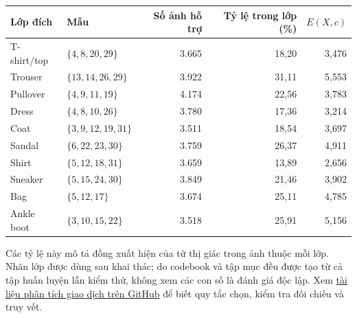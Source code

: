 \begin{center}
    \label{tab:fashion_top_pattern_per_class}
    \scriptsize
    \setlength{\tabcolsep}{2pt}
    \begin{tabular}{@{}l l r r r@{}}
        \toprule
        Lớp đích & Mẫu & Số ảnh hỗ trợ & Tỷ lệ trong lớp (\%) & $E(X,c)$ \\
        \midrule
        T-shirt/top & $\{4,8,20,29\}$ & 3.665 & 18,20 & 3,476 \\
        Trouser & $\{13,14,26,29\}$ & 3.922 & 31,11 & 5,553 \\
        Pullover & $\{4,9,11,19\}$ & 4.174 & 22,56 & 3,783 \\
        Dress & $\{4,8,10,26\}$ & 3.780 & 17,36 & 3,214 \\
        Coat & $\{3,9,12,19,31\}$ & 3.511 & 18,54 & 3,697 \\
        Sandal & $\{6,22,23,30\}$ & 3.759 & 26,37 & 4,911 \\
        Shirt & $\{5,12,18,31\}$ & 3.659 & 13,89 & 2,656 \\
        Sneaker & $\{5,15,24,30\}$ & 3.849 & 21,46 & 3,902 \\
        Bag & $\{5,12,17\}$ & 3.674 & 25,11 & 4,785 \\
        Ankle boot & $\{3,10,15,22\}$ & 3.518 & 25,91 & 5,156 \\
        \bottomrule
    \end{tabular}
\end{center}

Các tỷ lệ này mô tả đồng xuất hiện của từ thị giác trong ảnh thuộc mỗi lớp. Nhãn lớp được dùng sau khai thác; do codebook và tập mục đều được tạo từ cả tập huấn luyện lẫn kiểm thử, không xem các con số là đánh giá độc lập. Xem \href{https://github.com/NguyenVoTanDuy2006/DataMining-FIM-Project/blob/dbadabc4af05070c602b3bcd890150fcd496c885/notebook/UD2/demo/03_transaction_exploration_and_mining.ipynb}{tài liệu phân tích giao dịch trên GitHub} để biết quy tắc chọn, kiểm tra đối chiếu và truy vết.
